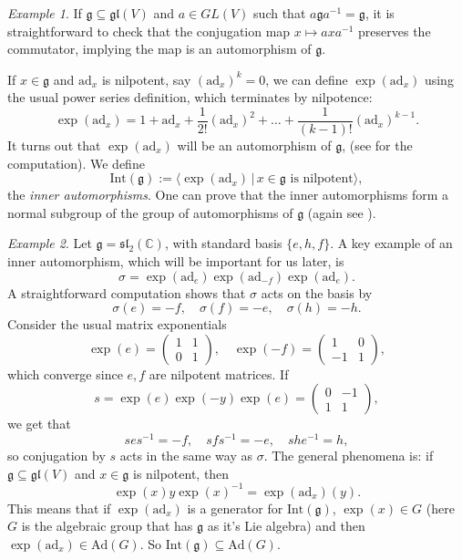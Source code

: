 \documentclass[12pt]{amsart}
\newcommand{\C}{\mathbb{C}}
\newcommand{\g}{\mathfrak{g}}
\newcommand{\h}{\mathfrak{h}}
\newcommand{\ad}{\mathrm{ad}}
\theoremstyle{remark}
\theoremstyle{remark}
\newtheorem*{example}{Example}
\theoremstyle{remark}
\begin{document}
\begin{example}
If $\g \subseteq \mathfrak{gl}(V)$ and $a \in GL(V)$ such that $a \g a^{-1} = \g$, it is straightforward to check that the conjugation map $x \mapsto a x a^{-1}$ preserves the commutator, implying the map is an automorphism of $\g$.
\end{example}

If $x \in \g$ and $\ad_x$ is nilpotent, say $(\ad_x)^k = 0$, we can define $\exp(\ad_x)$ using the usual power series definition, which terminates by nilpotence:
$$\exp(\ad_x) = 1 + \ad_x + \frac{1}{2!} (\ad_x)^2 + \ldots + \frac{1}{(k-1)!} (\ad_x)^{k-1}.$$
It turns out that $\exp(\ad_x)$ will be an automorphism of $\g$, (see \cite[\S 2.3]{Humphreys72} for the computation).
We define 
$$\mathrm{Int}(\g) := \langle \exp(\ad_x) \, | \, x \in \g \text{ is nilpotent}\rangle,$$
the \emph{inner automorphisms}.
One can prove that the inner automorphisms form a normal subgroup of the group of automorphisms of $\g$ (again see \cite[\S 2.3]{Humphreys72}).

\begin{example}
Let $\g = \mathfrak{sl}_2(\C)$, with standard basis $\{e, h, f\}$.
A key example of an inner automorphism, which will be important for us later, is
$$\sigma = \exp(\ad_e)\exp(\ad_{-f})\exp(\ad_e).$$
A straightforward computation shows that $\sigma$ acts on the basis by
$$\sigma(e) = -f, \quad \sigma(f) = -e, \quad \sigma(h) = -h.$$
Consider the usual matrix exponentials 
$$\exp(e) = 
\begin{pmatrix}
	1 & 1 \\
	0 & 1 
\end{pmatrix},
\quad
\exp(-f) =
\begin{pmatrix}
	1 & 0 \\
	-1 & 1
\end{pmatrix},$$
which converge since $e, f$ are nilpotent matrices.
If
$$s = \exp(e) \exp(-y) \exp(e) =
\begin{pmatrix}
	0 & -1 \\
	1 & 1
\end{pmatrix},$$
we get that
$$s e s^{-1} = -f, \quad s f s^{-1} = -e, \quad s h e^{-1}=h,$$
so conjugation by $s$ acts in the same way as $\sigma$.
The general phenomena is:
if $\g \subseteq \mathfrak{gl}(V)$ and $x \in \g$ is nilpotent, then
$$\exp(x) y \exp(x)^{-1} = \exp(\ad_x)(y).$$
This means that if $\exp(\ad_x)$ is a generator for $\mathrm{Int}(\g)$, $\exp(x) \in G$ (here $G$ is the algebraic group that has $\g$ as it's Lie algebra) and then $\exp(\ad_x) \in \mathrm{Ad}(G)$.
So $\mathrm{Int}(\g) \subseteq \mathrm{Ad}(G)$.
\end{example}
\end{document}
